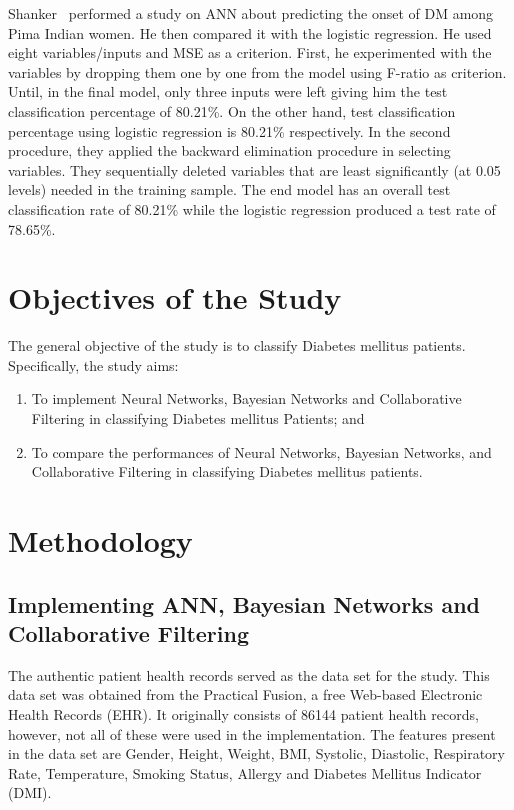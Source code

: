 \documentclass[journal]{./IEEE/IEEEtran}
\begin{document}
	Shanker~\cite{Shanker96} performed a study on ANN about predicting the onset of DM among Pima Indian women. He then compared it with the logistic regression. He used eight variables/inputs and MSE as a criterion. First, he experimented with the variables by dropping them one by one from the model using F-ratio as criterion. Until, in the final model, only three inputs were left giving him the test classification percentage of 80.21\%. On the other hand, test classification percentage using logistic regression is 80.21\% respectively. In the second procedure, they applied the backward elimination procedure in selecting variables. They sequentially deleted variables that are least significantly (at 0.05 levels) needed in the training sample. The end model has an overall test classification rate of 80.21\% while the logistic regression produced a test rate of 78.65\%. 

\section{Objectives of the Study}
The general objective of the study is to classify Diabetes mellitus patients. Specifically, the study aims:
\begin{enumerate}
	\item To implement Neural Networks, Bayesian Networks and Collaborative Filtering in classifying Diabetes mellitus Patients; and
	\item To compare the performances of  Neural Networks, Bayesian Networks, and Collaborative Filtering in classifying Diabetes mellitus patients.
\end{enumerate}

\section{Methodology}
\subsection{Implementing ANN, Bayesian Networks and Collaborative Filtering}
	The authentic patient health records served as the data set for the study. This data set was obtained from the Practical Fusion, a free Web-based Electronic Health Records (EHR). It originally consists of 86144 patient health records, however, not all of these were used in the implementation. The features present in the data set are Gender, Height, Weight, BMI, Systolic, Diastolic, Respiratory Rate, Temperature, Smoking Status, Allergy and Diabetes Mellitus Indicator (DMI).
\end{document}
